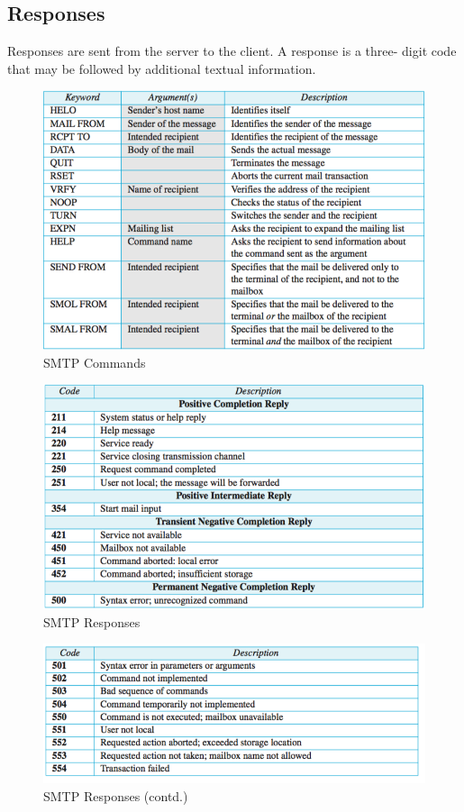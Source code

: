 \documentclass[a4paper,12pt]{article}
\begin{document}
 \subsection{Responses}
 Responses are sent from the server to the client. A response is a 
 three- digit code that may be followed by additional textual information.

\begin{figure}
	\includegraphics[width=\linewidth]{./SMTPcommads.png}
	\caption{SMTP Commands}
	\label{fig:smtpcommands}
\end{figure}
\begin{figure}
	\includegraphics[width=\linewidth]{./SMTPresponses.png}
	\caption{SMTP Responses}
	\label{fig:smtpresponses}
\end{figure}
\begin{figure}
	\includegraphics[width=\linewidth]{./SMTPresponses1.png}
	\caption{SMTP Responses (contd.)}
	\label{fig:smtpresponses1}
\end{figure}
\end{document}
